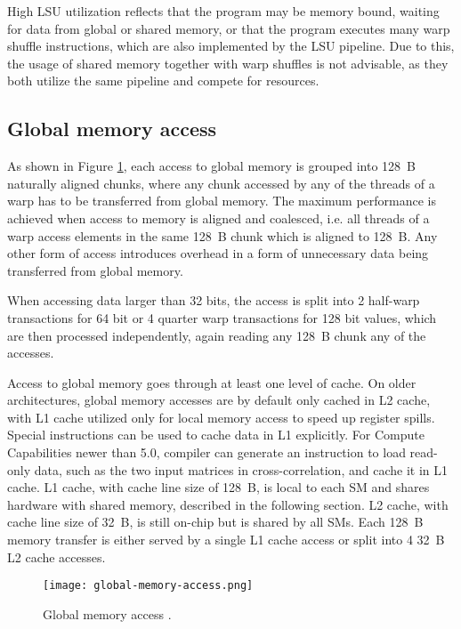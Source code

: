 High LSU utilization reflects that the program may be memory bound, waiting for data from global or shared memory, or that the program executes many warp shuffle instructions, which are also implemented by the LSU pipeline. Due to this, the usage of shared memory together with warp shuffles is not advisable, as they both utilize the same pipeline and compete for resources.


\subsection{Global memory access}
\label{sec:global_memory_access}

As shown in Figure \ref{fig:global_memory_access}, each access to global memory is grouped into 128~B naturally aligned chunks, where any chunk accessed by any of the threads of a warp has to be transferred from global memory. The maximum performance is achieved when access to memory is aligned and coalesced, i.e. all threads of a warp access elements in the same 128~B chunk which is aligned to 128~B. Any other form of access introduces overhead in a form of unnecessary data being transferred from global memory. 

When accessing data larger than 32 bits, the access is split into 2 half-warp transactions for 64 bit or 4 quarter warp transactions for 128 bit values, which are then processed independently, again reading any 128~B chunk any of the accesses. 

Access to global memory goes through at least one level of cache. On older architectures, global memory accesses are by default only cached in L2 cache, with L1 cache utilized only for local memory access to speed up register spills. %
Special instructions can be used to cache data in L1 explicitly. For Compute Capabilities newer than 5.0, compiler can generate an instruction to load read-only data, such as the two input matrices in cross-correlation, and cache it in L1 cache. L1 cache, with cache line size of 128~B, is local to each SM and shares hardware with shared memory, described in the following section. L2 cache, with cache line size of 32~B, is still on-chip but is shared by all SMs. Each 128~B memory transfer is either served by a single L1 cache access or split into 4 32~B L2 cache accesses.

\begin{figure}[ht]
	\centering
	\texttt{[image: global-memory-access.png]}
	\caption{Global memory access \citep{site:cuda}.}
	\label{fig:global_memory_access}
\end{figure}

